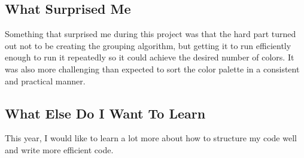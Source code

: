 \documentclass[letterpaper,12pt]{article}
\begin{document}
\subsection{What Surprised Me}
Something that surprised me during this project was that the hard part turned out not to be creating the grouping algorithm, but getting it to run efficiently enough to run it repeatedly so it could achieve the desired number of colors. It was also more challenging than expected to sort the color palette in a consistent and practical manner.

\subsection{What Else Do I Want To Learn}
This year, I would like to learn a lot more about how to structure my code well and write more efficient code.\textsl{\textsl{}}
\end{document}
